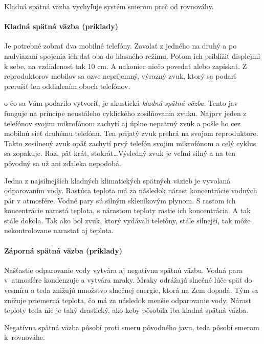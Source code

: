 \documentclass[a4paper, 10pt, ]{article}
\begin{document}
Kladná spätná väzba vychyľuje systém smerom preč od rovnováhy.


\paragraph{Kladná spätná väzba (príklady)}

Je potrebné zobrať dva mobilné telefóny. Zavolať z jedného na druhý a po nadviazaní spojenia ich dať oba do hlasného režimu. Potom ich priblížiť displejmi k sebe, na vzdialenosť tak 10 cm. A nakoniec niečo povedať alebo zapískať. Z reproduktorov mobilov sa ozve nepríjemný, výrazný zvuk, ktorý sa podarí prerušiť len oddialením oboch telefónov.

o čo sa Vám podarilo vytvoriť, je akustická \emph{kladná spätná väzba}. Tento jav funguje na princípe neustáleho cyklického zosilňovania zvuku. Najprv jeden z telefónov svojim mikrofónom zachytí aj úplne nepatrný zvuk a pošle ho cez mobilnú sieť druhému telefónu. Ten prijatý zvuk prehrá na svojom reproduktore. Takto zosilnený zvuk opäť zachytí prvý telefón svojim mikrofónom a celý cyklus sa zopakuje. Raz, päť krát, stokrát\ldots Výsledný zvuk je veľmi silný a na ten pôvodný sa už ani zďaleka nepodobá.

\bigskip

\noindent
Jedna z najsilnejších kladných klimatických spätných väzieb je vyvolaná odparovaním vody. Rastúca teplota má za následok nárast koncentrácie vodných pár v atmosfére. Vodné pary sú silným skleníkovým plynom. S rastom ich koncentrácie narastá teplota, s nárastom teploty rastie ich koncentrácia. A tak stále dokola. Tak ako bol zvuk, ktorý vydávali telefóny, stále silnejší, tak môže nekontrolovane narastať aj teplota.

\paragraph{Záporná spätná väzba (príklady)}

Našťastie odparovanie vody vytvára aj negatívnu spätnú väzbu. Vodná para v~atmosfére kondenzuje a vytvára mraky. Mraky odrážajú slnečné lúče späť do vesmíru a teda znižujú množstvo slnečnej energie, ktorá na Zem dopadá. Tým sa znižuje priemerná teplota, čo má za následok menšie odparovanie vody. Nárast teploty teda nie je taký drastický, ako keby pôsobila iba kladná spätná väzba.


\bigskip

\noindent
Negatívna spätná väzba pôsobí proti smeru pôvodného javu, teda pôsobí smerom k~rovnováhe.
\end{document}
